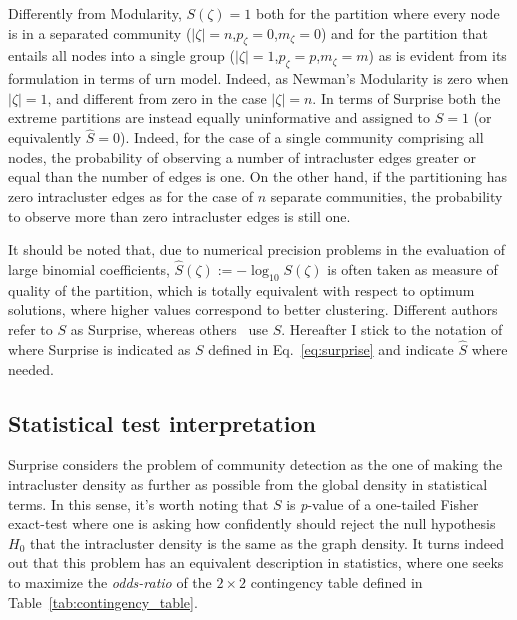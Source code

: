 Differently from Modularity, $S(\zeta)=1$ both for the partition where every node is in a separated community ($|\zeta|=n$,$p_\zeta=0$,$m_\zeta=0$) and for the partition that entails all nodes into a single group ($|\zeta|=1$,$p_\zeta=p$,$m_\zeta=m$) as is evident from its formulation in terms of urn model.
Indeed, as Newman's Modularity is zero when $|\zeta|=1$, and different from zero in the case $|\zeta|=n$.
In terms of Surprise both the extreme partitions are instead equally uninformative and assigned to $S=1$ (or equivalently $\hat{S}=0$).
Indeed, for the case of a single community comprising all nodes, the probability of observing a number of intracluster edges greater or equal than the number of edges is one. On the other hand, if the partitioning has zero intracluster edges as for the case of $n$ separate communities, the probability to observe more than zero intracluster edges is still one.

It should be noted that, due to numerical precision problems in the evaluation of large binomial coefficients, $\hat{S}(\zeta) := -\log_{10}S(\zeta)$ is often taken as measure of quality of the partition, which is totally equivalent with respect to optimum solutions, where higher values correspond to better clustering.
Different authors~\cite{arnauVMarsS2005,fleck2014} refer to $S$ as Surprise, whereas others~\cite{aldecoa2011,aldecoa2013} use $\hat{S}$. Hereafter I stick to the notation of~\cite{fleck2014} where Surprise is indicated as $S$ defined in Eq.~\ref{eq:surprise} and indicate $\hat{S}$ where needed.

\subsection{Statistical test interpretation}
\label{sec:surprisefishertest}
Surprise considers the problem of community detection as the one of making the intracluster density as further as possible from the global density in statistical terms.
In this sense, it's worth noting that $S$ is \emph{p}-value of a one-tailed Fisher exact-test where one is asking how confidently should reject the null hypothesis $H_0$ that the intracluster density is the same as the graph density.
It turns indeed out that this problem has an equivalent description in statistics, where one seeks to maximize the \emph{odds-ratio} of the $2 \times 2$ contingency table defined in Table~\ref{tab:contingency_table}.

